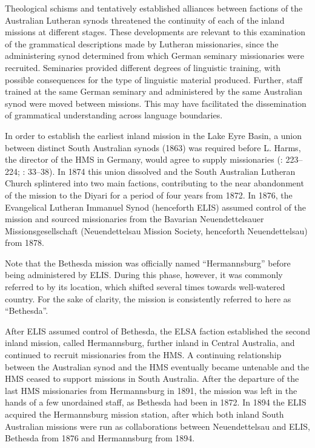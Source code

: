 Theological schisms and tentatively established alliances between factions of the Australian Lutheran synods threatened the continuity of each of the inland missions at different stages. These developments are relevant to this examination of the grammatical descriptions made by Lutheran missionaries, since the administering synod determined from which German seminary missionaries were recruited. Seminaries provided different degrees of linguistic training, with possible consequences for the type of linguistic material produced. Further, staff trained at the same German seminary and administered by the same Australian synod were moved between missions. This may have facilitated the dissemination of grammatical understanding across language boundaries.

\largerpage
In order to establish the earliest inland mission in the Lake Eyre Basin, a union between distinct South Australian synods (1863) was required before L. Harms, the director of the HMS in Germany, would agree to supply missionaries (\citealt{brauer_history_1956}: 223--224; \citealt{proeve_work_1952}: 33--38). In {1874} this union dissolved and the South Australian Lutheran Church splintered into two main factions, contributing to the near abandonment of the mission to the Diyari for a period of four years from 1872. In {1876}, the Evangelical Lutheran Immanuel Synod (henceforth ELIS) assumed control of the mission and sourced missionaries from the Bavarian Neuendettelsauer Missionsgesellschaft (Neuendettelsau Mission Society, henceforth Neuendettelsau) from 1878.

Note that the Bethesda mission was officially named “Hermannsburg” before being administered by ELIS. During this phase, however, it was commonly referred to by its location, which shifted several times towards well-watered country. For the sake of clarity, the mission is consistently referred to here as ``Bethesda''.

After ELIS assumed control of Bethesda, the ELSA faction established the second inland mission, called Hermannsburg, further inland in Central Australia, and continued to recruit missionaries from the HMS. A continuing relationship between the Australian synod and the HMS eventually became untenable \citep[148]{harms_traume_2003} and the HMS ceased to support missions in South Australia. After the departure of the last HMS missionaries from Hermannsburg in 1891, the mission was left in the hands of a few unordained staff, as Bethesda had been in 1872. In 1894 the ELIS acquired the Hermannsburg mission station, after which both inland South Australian missions were run as collaborations between Neuendettelsau and ELIS, Bethesda from 1876 and Hermannsburg from 1894.

